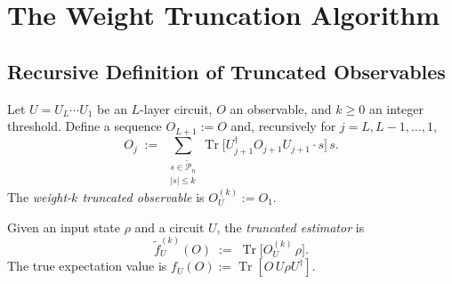 \chapter{The Weight Truncation Algorithm}

\section{Recursive Definition of Truncated Observables}

\begin{definition}
  \label{def:truncated-observable}
  \leanok
  Let $U = U_L \cdots U_1$ be an $L$-layer circuit, $O$ an observable, and $k \geq 0$
  an integer threshold.  Define a sequence $O_{L+1} := O$ and, recursively for
  $j = L, L-1, \ldots, 1$,
  \[
    O_j
    \;:=\;
    \sum_{\substack{s \in \widetilde{\mathcal{P}}_n \\ |s| \leq k}}
    \operatorname{Tr}\!\bigl[U_{j+1}^\dagger O_{j+1} U_{j+1} \cdot s\bigr]\,s.
  \]
  The \emph{weight-$k$ truncated observable} is $O_U^{(k)} := O_1$.
\end{definition}

\begin{definition}
  \label{def:truncated-estimator}
  \leanok
  Given an input state $\rho$ and a circuit $U$, the \emph{truncated estimator} is
  \[
    \tilde{f}_U^{(k)}(O) \;:=\; \operatorname{Tr}\!\bigl[O_U^{(k)}\,\rho\bigr].
  \]
  The true expectation value is $f_U(O) := \operatorname{Tr}[O\,U\rho U^\dagger]$.
\end{definition}



